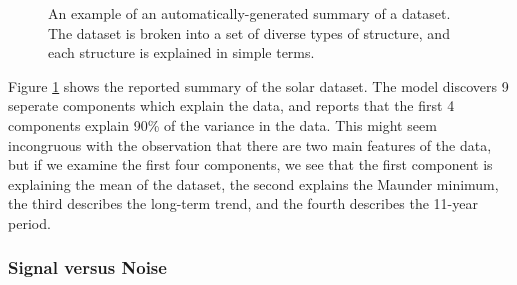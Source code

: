 \documentclass{article} %
\begin{document}
\begin{figure}[h]
\centering
{}
\caption{
An example of an automatically-generated summary of a dataset.  The dataset is broken into a set of diverse types of structure, and each structure is explained in simple terms.}
\label{fig:exec}
\end{figure}

Figure \ref{fig:exec} shows the reported summary of the solar dataset.  The model discovers 9 seperate components which explain the data, and reports that the first 4 components explain 90\% of the variance in the data.  This might seem incongruous with the observation that there are two main features of the data, but if we examine the first four components, we see that the first component is explaining the mean of the dataset, the second explains the Maunder minimum, the third describes the long-term trend, and the fourth describes the 11-year period.


\subsubsection{Signal versus Noise}
\end{document}
